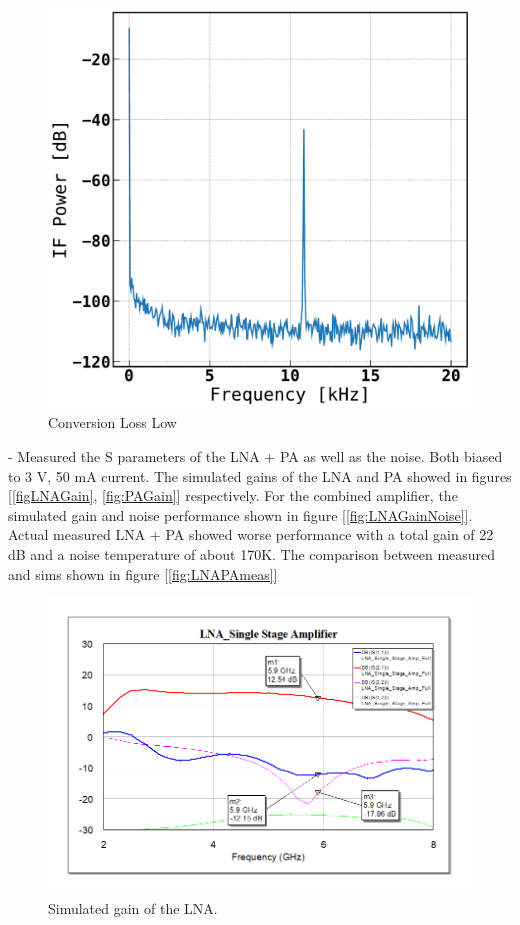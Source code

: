 \documentclass[reprint, aps, prl]{revtex4-1}
\begin{document}
\begin{figure}[!htbp]
    \centering
    \includegraphics[scale=0.35]{Mixer_10K.pdf}
    \caption{Conversion Loss Low}
    \label{fig:mixer10}
\end{figure}


- Measured the S parameters of the LNA + PA as well as the noise. Both biased to 3 V, 50 mA current. The simulated gains of the LNA and PA showed in figures [\ref{figLNAGain}, \ref{fig:PAGain}] respectively. For the combined amplifier, the simulated gain and noise performance shown in figure [\ref{fig:LNAGainNoise}]. Actual measured LNA + PA showed worse performance with a total gain of 22 dB and a noise temperature of about 170K. The comparison between measured and sims shown in figure [\ref{fig:LNAPAmeas}]

\begin{figure}[!htbp]
    \centering
    \includegraphics[scale=0.35]{LNA_Gain.png}
    \caption{Simulated gain of the LNA.}
    \label{fig:LNAGain}
\end{figure}
\end{document}
